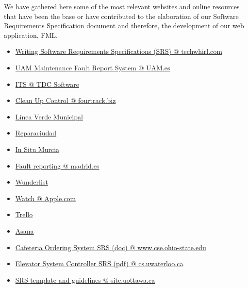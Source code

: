 We have gathered here some of the most relevant websites and online resources that have been the base or have contributed to the elaboration of our Software Requirements Specification document and therefore, the development of our web application, FML.

\begin{itemize}
\item \href{http://techwhirl.com/writing-software-requirements-specifications/}{Writing Software Requirements Specifications (SRS) @ techwhirl.com}

\item \href{http://www.uam.es/ss/Satellite/es/1234886352057/1242647722813/servicio/servicio/Servicio_de_Mantenimiento.htm}{UAM Maintenance Fault Report System @ UAM.es}

\item\href{http://www.tdcsoftware.com/?q=en/node/15}{ITS @ TDC Software}

\item\href{http://www.fourtrack.biz/documents/castella/Clean-Up%20Control.pdf}{Clean Up Control @ fourtrack.biz}

\item \href{http://www.lineaverdemunicipal.com/Default.aspx}{Línea Verde Municipal}

\item \href{http://reparaciudad.com}{Reparaciudad}

\item \href{http://www.insitumurcia.es}{In Situ Murcia}

\item \href{https://sede.madrid.es/portal/site/tramites/menuitem.77902acb5cdfe761e8e4e8e4ecd08a0c/?vgnextoid=ce5ea38813180210VgnVCM100000c90da8c0RCRD}{Fault reporting @ madrid.es}

\item \href{http://wunderlist.com}{Wunderlist}

\item \href{https://www.apple.com/watch/}{Watch @ Apple.com}

\item \href{http://trello.com}{Trello}

\item \href{http://asana.com}{Asana}

\item \href{https://www.google.es/url?sa=t&rct=j&q=&esrc=s&source=web&cd=7&cad=rja&uact=8&ved=0CFsQFjAG&url=http%3A%2F%2Fwww.cse.ohio-state.edu%2F~igorm%2FCSE762%2FSP11%2FDocumentation%2FTemplates%2FCOS_SRS.doc&ei=aGbqVN3aBYHmUp-MgrgB&usg=AFQjCNFe2qSNcCKqmKozUPIb-N7_kGc3tA&sig2=09OHiEy6sOYQ88Ns_Xu_pQ&bvm=bv.86475890,d.d24}{Cafeteria Ordering System SRS (doc) @ www.cse.ohio-state.edu}

\item \href{https://cs.uwaterloo.ca/~dberry/ATRE/ElevatorSRSs/FinalSRSes/SRS-Alex-Kalaidjian.pdf}{Elevator System Controller SRS (pdf) @ cs.uwaterloo.ca}

\item \href{http://www.site.uottawa.ca/~shervin/courses/seg4105/project/SRS.html}{SRS template and guidelines @ site.uottawa.ca}
\end{itemize}
